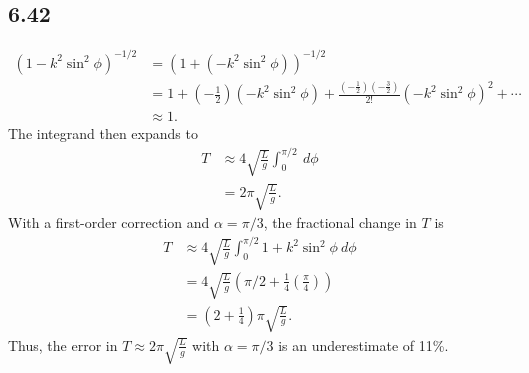 \documentclass[10pt]{mypackage}
\begin{document}
\subsection{6.42}%
\begin{align*}
  \left(1 - k^2\sin^2\phi\right)^{-1/2} &= \left(1 + \left(-k^2\sin^2\phi\right)\right)^{-1/2}\\
                                        &= 1 + \left(-\frac{1}{2}\right)\left(-k^2\sin^2\phi\right) + \frac{\left(-\frac{1}{2}\right)\left(-\frac{3}{2}\right)}{2!}\left(-k^2\sin^2\phi\right)^{2} + \cdots\\
                                        &\approx 1.
\end{align*}
The integrand then expands to
\begin{align*}
  T &\approx 4\sqrt{\frac{L}{g}}\int_{0}^{\pi/2}\:d\phi\\
    &= 2\pi \sqrt{\frac{L}{g}}.
\end{align*}
With a first-order correction and $\alpha = \pi/3$, the fractional change in $T$ is
\begin{align*}
  T &\approx 4\sqrt{\frac{L}{g}}\int_{0}^{\pi/2} 1 + k^2\sin^2\phi\:d\phi\\
    &= 4\sqrt{\frac{L}{g}}\left(\pi/2 + \frac{1}{4}\left(\frac{\pi}{4}\right)\right)\\
    &= \left(2 + \frac{1}{4}\right)\pi \sqrt{\frac{L}{g}}.
\end{align*}
Thus, the error in $T \approx 2\pi \sqrt{\frac{L}{g}}$ with $\alpha = \pi/3$ is an underestimate of 11\%.
\end{document}
